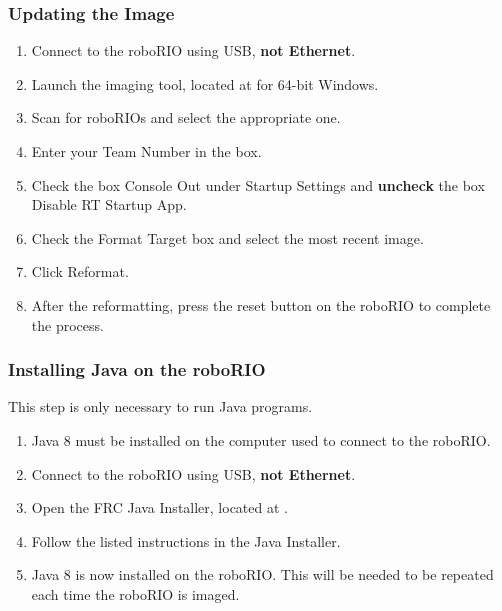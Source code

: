 \documentclass[]{report}
\begin{document}
\subsubsection{Updating the Image}
\begin{enumerate}
\item Connect to the roboRIO using USB, \textbf{not Ethernet}.
\item Launch the imaging tool, located at  for 64-bit Windows.
\item Scan for roboRIOs and select the appropriate one.
\item Enter your Team Number in the box.
\item Check the box Console Out under Startup Settings and \textbf{uncheck} the box Disable RT Startup App.
\item Check the Format Target box and select the most recent image.
\item Click Reformat.
\item After the reformatting, press the reset button on the roboRIO to complete the process.
\end{enumerate}

\subsubsection{Installing Java on the roboRIO}
This step is only necessary to run Java programs.
\begin{enumerate}
\item Java 8 must be installed on the computer used to connect to the roboRIO.
\item Connect to the roboRIO using USB, \textbf{not Ethernet}.
\item Open the FRC Java Installer, located at .
\item Follow the listed instructions in the Java Installer.
\item Java 8 is now installed on the roboRIO. This will be needed to be repeated each time the roboRIO is imaged.
\end{enumerate}
\end{document}
